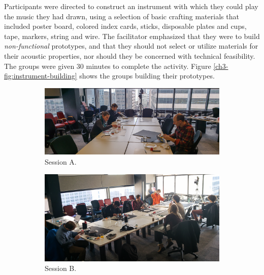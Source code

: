 \documentclass[letterpaper, 12pt]{article}
\begin{document}
Participants were directed to construct an instrument with which they could play the music they had drawn, using a selection of basic crafting materials that included poster board, colored index cards, sticks, disposable plates and cups, tape, markers, string and wire. The facilitator emphasized that they were to build \emph{non-functional} prototypes, and that they should not select or utilize materials for their acoustic properties, nor should they be concerned with technical feasibility. The groups were given 30 minutes to complete the activity. Figure \ref{ch3-fig:instrument-building} shows the groups building their prototypes.

\begin{figure}[t]
    \centering
    \begin{subfigure}[]{1\textwidth}
        \centering
        \includegraphics[width=1\textwidth]{ch3_dfp_nfp_A.jpg}
        \caption{Session A.}
    \end{subfigure}
    \par\bigskip
    \begin{subfigure}[]{0.59\textwidth}
        \centering
        \includegraphics[width=1\textwidth]{ch3_dfp_nfp_B.jpg}
        \caption{Session B.}
    \end{subfigure}
    \begin{subfigure}[]{0.4\textwidth}

\end{subfigure}
\end{figure}
\end{document}

